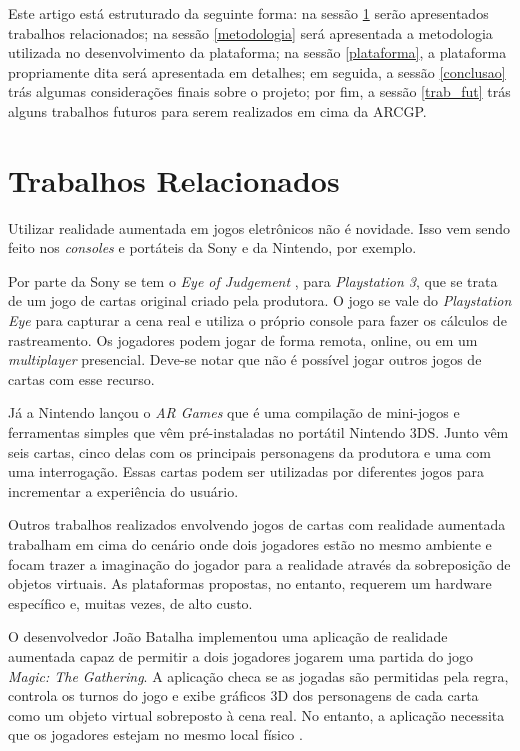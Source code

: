 \documentclass[conference]{IEEEtran}
\begin{document}
Este artigo está estruturado da seguinte forma: na sessão \ref{rel} serão 
apresentados trabalhos relacionados; na sessão \ref{metodologia} será 
apresentada a metodologia utilizada no desenvolvimento da plataforma; na 
sessão \ref{plataforma}, a plataforma propriamente dita será apresentada em 
detalhes; em seguida, a sessão \ref{conclusao} trás algumas considerações finais 
sobre o projeto; por fim, a sessão \ref{trab_fut} trás alguns trabalhos futuros 
para serem realizados em cima da ARCGP.

\section{Trabalhos Relacionados}
\label{rel}
Utilizar realidade aumentada em jogos eletrônicos não é novidade. Isso vem sendo 
feito nos \textit{consoles} e portáteis da Sony e da Nintendo, por exemplo.

Por parte da Sony se tem o \textit{Eye of Judgement} \cite{eyesony}, para 
\textit{Playstation 3}, que se trata de um jogo de cartas original criado pela 
produtora. O jogo se vale do \textit{Playstation Eye} para capturar a cena real 
e utiliza o próprio console para fazer os cálculos de rastreamento. Os jogadores 
podem jogar de forma remota, online, ou em um \textit{multiplayer} presencial. 
Deve-se notar que não é possível jogar outros jogos de cartas com esse recurso.

Já a Nintendo lançou o \textit{AR Games} \cite{3ds} que é uma compilação de 
mini-jogos e ferramentas simples que vêm pré-instaladas no portátil Nintendo 
3DS. Junto vêm seis cartas, cinco delas com os principais personagens da 
produtora e uma com uma interrogação. Essas cartas podem ser utilizadas por 
diferentes jogos para incrementar a experiência do usuário.

Outros trabalhos realizados envolvendo jogos de cartas com realidade aumentada 
trabalham em cima do cenário onde dois jogadores estão no mesmo ambiente e focam 
trazer a imaginação do jogador para a realidade através da sobreposição de 
objetos virtuais. As plataformas propostas, no entanto, requerem um hardware 
específico e, muitas vezes, de alto custo.

O desenvolvedor João Batalha implementou uma aplicação de realidade aumentada 
capaz de permitir a dois jogadores jogarem uma partida do jogo \textit{Magic: 
The Gathering}. A aplicação checa se as jogadas são permitidas pela regra, 
controla os turnos do jogo e exibe gráficos 3D dos personagens de cada carta 
como um objeto virtual sobreposto à cena real. No entanto, a aplicação necessita 
que os jogadores estejam no mesmo local físico \cite{joao}.
\end{document}
